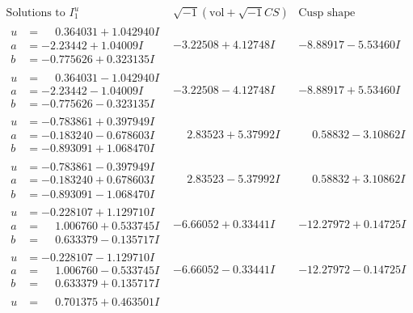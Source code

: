 \documentclass[1p]{elsarticle_modified}
\theoremstyle{definition}
\newcommand{\I}{\sqrt{-1}}
\begin{document}
$$\begin{array}{c|c|c}  
\text{Solutions to }I^u_{1}& \I (\text{vol} + \sqrt{-1}CS) & \text{Cusp shape}\\
 \hline 
\begin{aligned}
u &= \phantom{-}0.364031 + 1.042940 I \\
a &= -2.23442 + 1.04009 I \\
b &= -0.775626 + 0.323135 I\end{aligned}
 & -3.22508 + 4.12748 I & -8.88917 - 5.53460 I \\ \hline\begin{aligned}
u &= \phantom{-}0.364031 - 1.042940 I \\
a &= -2.23442 - 1.04009 I \\
b &= -0.775626 - 0.323135 I\end{aligned}
 & -3.22508 - 4.12748 I & -8.88917 + 5.53460 I \\ \hline\begin{aligned}
u &= -0.783861 + 0.397949 I \\
a &= -0.183240 - 0.678603 I \\
b &= -0.893091 + 1.068470 I\end{aligned}
 & \phantom{-}2.83523 + 5.37992 I & \phantom{-}0.58832 - 3.10862 I \\ \hline\begin{aligned}
u &= -0.783861 - 0.397949 I \\
a &= -0.183240 + 0.678603 I \\
b &= -0.893091 - 1.068470 I\end{aligned}
 & \phantom{-}2.83523 - 5.37992 I & \phantom{-}0.58832 + 3.10862 I \\ \hline\begin{aligned}
u &= -0.228107 + 1.129710 I \\
a &= \phantom{-}1.006760 + 0.533745 I \\
b &= \phantom{-}0.633379 - 0.135717 I\end{aligned}
 & -6.66052 + 0.33441 I & -12.27972 + 0.14725 I \\ \hline\begin{aligned}
u &= -0.228107 - 1.129710 I \\
a &= \phantom{-}1.006760 - 0.533745 I \\
b &= \phantom{-}0.633379 + 0.135717 I\end{aligned}
 & -6.66052 - 0.33441 I & -12.27972 - 0.14725 I \\ \hline\begin{aligned}
u &= \phantom{-}0.701375 + 0.463501 I \\

\end{aligned}
\end{array}$$
\end{document}
